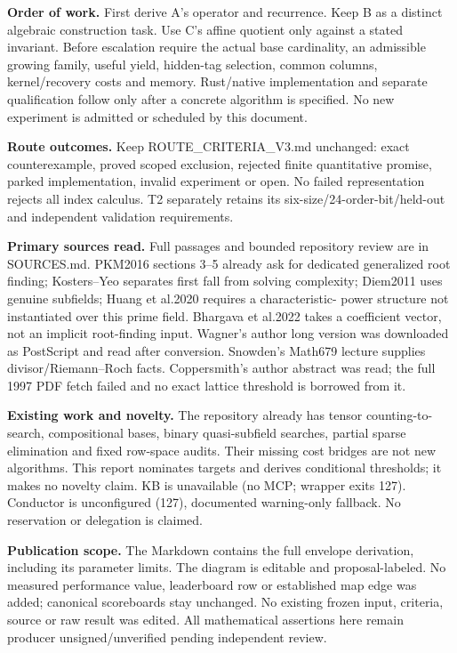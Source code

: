\documentclass[10pt]{article}
\begin{document}
\textbf{Order of work.} First derive A's operator and recurrence. Keep B as a
distinct algebraic construction task. Use C's affine quotient only against
a stated invariant. Before escalation require the actual base cardinality,
an admissible growing family, useful yield, hidden-tag selection, common
columns, kernel/recovery costs and memory. Rust/native implementation and
separate qualification follow only after a concrete algorithm is specified.
No new experiment is admitted or scheduled by this document.

\textbf{Route outcomes.} Keep ROUTE\_CRITERIA\_V3.md unchanged: exact
counterexample, proved scoped exclusion, rejected finite quantitative
promise, parked implementation, invalid experiment or open. No failed
representation rejects all index calculus. T2 separately retains its
six-size/24-order-bit/held-out and independent validation requirements.

\textbf{Primary sources read.} Full passages and bounded repository review
are in SOURCES.md. PKM2016 sections 3--5 already ask for dedicated generalized
root finding; Kosters--Yeo separates first fall from solving complexity;
Diem2011 uses genuine subfields; Huang et al.2020 requires a characteristic-
power structure not instantiated over this prime field. Bhargava et al.2022
takes a coefficient vector, not an implicit root-finding input. Wagner's
author long version was downloaded as PostScript and read after conversion.
Snowden's Math679 lecture supplies divisor/Riemann--Roch facts. Coppersmith's
author abstract was read; the full 1997 PDF fetch failed and no exact lattice
threshold is borrowed from it.

\textbf{Existing work and novelty.} The repository already has tensor
counting-to-search, compositional bases, binary quasi-subfield searches,
partial sparse elimination and fixed row-space audits. Their missing cost
bridges are not new algorithms. This report nominates targets and derives
conditional thresholds; it makes no novelty claim. KB is unavailable (no MCP;
wrapper exits 127). Conductor is unconfigured (127), documented warning-only
fallback. No reservation or delegation is claimed.

\textbf{Publication scope.} The Markdown contains the full envelope derivation,
including its parameter limits. The diagram is editable and proposal-labeled.
No measured performance value, leaderboard row or established map edge was
added; canonical scoreboards stay unchanged. No existing frozen input,
criteria, source or raw result was edited. All mathematical assertions here
remain producer unsigned/unverified pending independent review.
\end{document}
